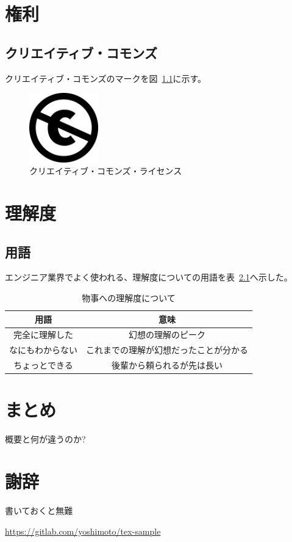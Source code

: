 \documentclass[a4j,openany,11px]{jsbook}
\begin{document}
\chapter{権利}
\section{クリエイティブ・コモンズ}
クリエイティブ・コモンズのマークを図~\ref{fig:cc}に示す。
\begin{figure}[htbp]
    \centering
    \includegraphics[width=30mm]{./figs/240px-Cc-public_domain_mark_white.png}
    \caption{クリエイティブ・コモンズ・ライセンス\label{fig:cc}}
\end{figure}


\chapter{理解度}
\section{用語}
エンジニア業界でよく使われる、理解度についての用語を表~\ref{tab:understanding}へ示した。
\begin{table}[htbp]
    \centering
    \caption{物事への理解度について\label{tab:understanding}}
    \begin{tabular}{c|c}
        用語             & 意味                                   \\
        \hline
        \hline
        完全に理解した   & 幻想の理解のピーク                     \\
        なにもわからない & これまでの理解が幻想だったことが分かる \\
        ちょっとできる   & 後輩から頼られるが先は長い             \\
        \hline
    \end{tabular}
\end{table}

\chapter{まとめ}
概要と何が違うのか?

\chapter*{謝辞}
書いておくと無難

\listoftables %

\listoffigures %

\begin{thebibliography}{99}
    \url{https://gitlab.com/yoshimoto/tex-sample}
\end{thebibliography}
\end{document}
